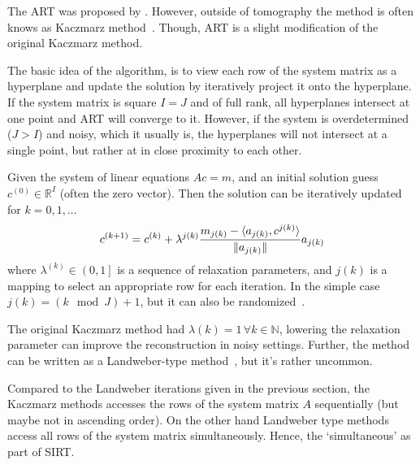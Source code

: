 The \gls{ART} was proposed by \citeauthor{gordon_algebraic_1970}\cite{gordon_algebraic_1970}.
However, outside of tomography the method is often knows as Kaczmarz
method~\cite{kaczmarz_approximate_1993}. Though, \gls{ART} is a slight modification of the original
Kaczmarz method.

The basic idea of the algorithm, is to view each row of the system matrix as a hyperplane and update
the solution by iteratively project it onto the hyperplane. If the system matrix is square \(I = J\)
and of full rank, all hyperplanes intersect at one point and \gls{ART} will converge to it. However, if
the system is overdetermined (\(J > I\)) and noisy, which it usually is, the hyperplanes will not
intersect at a single point, but rather at in close proximity to each other.

\begin{definition}\label{def:art}
	Given the system of linear equations \(Ac = m\), and an initial solution guess \(c^{(0)} \in
	\mathbb{R}^I\) (often the zero vector). Then the solution can be iteratively updated for
	\(k = 0, 1, \dots\)
	\[
		c^{(k+1)} = c^{(k)} + \lambda^{j(k)} \frac{m_{j(k)} - \langle a_{j(k)}, c^{j(k)} \rangle}{\lVert a_{j(k)}\rVert}a_{j(k)}
	\]
	where \(\lambda^{(k)} \in \left(0, 1\right]\) is a sequence of relaxation parameters, and
	\(j(k)\) is a mapping to select an appropriate row for each iteration. In the simple case
	\(j(k) = (k \mod J) + 1\), but it can also be randomized~\cite{strohmer_randomized_2007}.
\end{definition}

The original Kaczmarz method had \(\lambda(k) = 1\, \forall k \in \mathbb{N}\), lowering the
relaxation parameter can improve the reconstruction in noisy settings. Further, the method can be
written as a Landweber-type method~\cite{hansen_discrete_2010}, but it's rather uncommon.

Compared to the Landweber iterations given in the previous section, the Kaczmarz methods accesses
the rows of the system matrix \(A\) sequentially (but maybe not in ascending order). On the other
hand Landweber type methods access all rows of the system matrix simultaneously. Hence, the
`simultaneous' as part of \gls{SIRT}\@.


%
%
%

